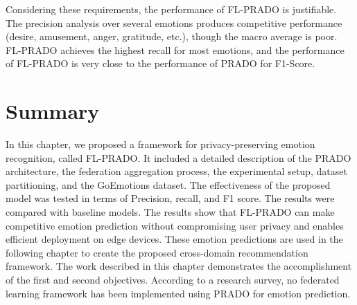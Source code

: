 Considering these requirements, the performance of FL-PRADO is justifiable. The precision analysis over several emotions produces competitive performance (desire, amusement, anger, gratitude, etc.), though the macro average is poor. FL-PRADO achieves the highest recall for most emotions, and the performance of FL-PRADO is very close to the performance of PRADO for F1-Score.

\section{Summary}
In this chapter, we proposed a framework for privacy-preserving emotion recognition, called FL-PRADO. It included a detailed description of the PRADO architecture, the federation aggregation process, the experimental setup, dataset partitioning, and the GoEmotions dataset. The effectiveness of the proposed model was tested in terms of Precision, recall, and F1 score. The results were compared with baseline models. The results show that FL-PRADO can make competitive emotion prediction without compromising user privacy and enables efficient deployment on edge devices. These emotion predictions are used in the following chapter to create the proposed cross-domain recommendation framework. The work described in this chapter demonstrates the accomplishment of the first and second objectives. According to a research survey, no federated learning framework has been implemented using PRADO for emotion prediction.

